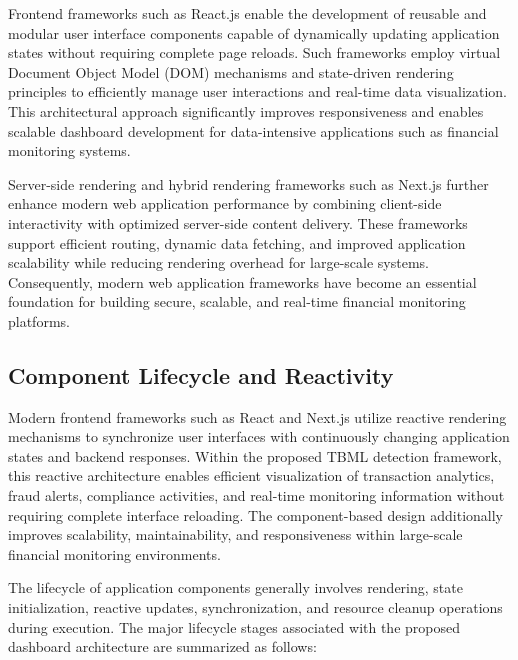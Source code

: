 Frontend frameworks such as React.js enable the development of reusable and modular user interface components capable of dynamically updating application states without requiring complete page reloads. Such frameworks employ virtual Document Object Model (DOM) mechanisms and state-driven rendering principles to efficiently manage user interactions and real-time data visualization. This architectural approach significantly improves responsiveness and enables scalable dashboard development for data-intensive applications such as financial monitoring systems.

Server-side rendering and hybrid rendering frameworks such as Next.js further enhance modern web application performance by combining client-side interactivity with optimized server-side content delivery. These frameworks support efficient routing, dynamic data fetching, and improved application scalability while reducing rendering overhead for large-scale systems. Consequently, modern web application frameworks have become an essential foundation for building secure, scalable, and real-time financial monitoring platforms.


\subsection[Component Lifecycle and Reactivity]{\textbf{Component Lifecycle and Reactivity}}

Modern frontend frameworks such as React and Next.js utilize reactive rendering mechanisms to synchronize user interfaces with continuously changing application states and backend responses. Within the proposed TBML detection framework, this reactive architecture enables efficient visualization of transaction analytics, fraud alerts, compliance activities, and real-time monitoring information without requiring complete interface reloading. The component-based design additionally improves scalability, maintainability, and responsiveness within large-scale financial monitoring environments.

The lifecycle of application components generally involves rendering, state initialization, reactive updates, synchronization, and resource cleanup operations during execution. The major lifecycle stages associated with the proposed dashboard architecture are summarized as follows:

\vspace{0.3cm}

